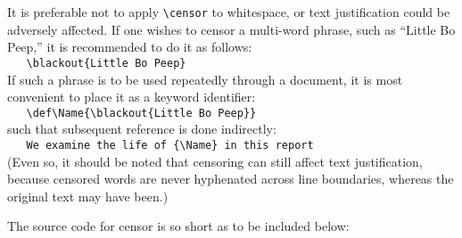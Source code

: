 \documentclass{article}
\begin{document}
It is preferable not to apply \verb|\censor| to whitespace, or text
justification could be adversely affected.  If one wishes to censor a
multi-word phrase, such as ``Little Bo Peep,'' it is recommended to do
it as follows:\\
\verb|   \blackout{Little Bo Peep}|\\
If such a phrase is to be used repeatedly through a document, 
it is most convenient to place it as a keyword identifier:\\
\verb|   \def\Name{\blackout{Little Bo Peep}}|\\
such that subsequent reference is done indirectly:\\
\verb|   We examine the life of {\Name} in this report|\\
(Even so, it should be noted that censoring can still affect text
justification, because censored words are never hyphenated across line
boundaries, whereas the original text may have been.)

The source code for \textsf{censor} is so short as to be included below:


\end{document}
